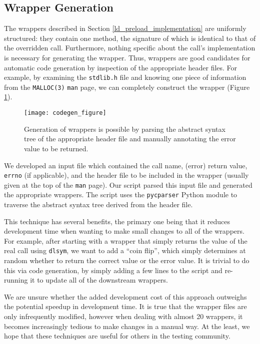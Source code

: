 \subsection{Wrapper Generation}
The wrappers described in Section \ref{ld_preload_implementation} are uniformly structured: they contain one method, the signature of which is identical to that of the overridden call. Furthermore, nothing specific about the call's implementation is necessary for generating the wrapper. Thus, wrappers are good candidates for automatic code generation by inspection of the appropriate header files. For example, by examining the \texttt{stdlib.h} file and knowing one piece of information from the \texttt{MALLOC(3)} \texttt{man} page, we can completely construct the wrapper (Figure \ref{fig:codegen}).

\begin{figure}[h!]
\centering
\texttt{[image: codegen\_figure]}
\caption{Generation of wrappers is possible by parsing the abstract syntax tree of the appropriate header file and manually annotating the error value to be returned.}
\label{fig:codegen}
\end{figure}

We developed an input file which contained the call name, (error) return value, \texttt{errno} (if applicable), and the header file to be included in the wrapper (usually given at the top of the \texttt{man} page). Our script parsed this input file and generated the appropriate wrappers. The script uses the \texttt{pycparser} Python module \cite{pycparser} to traverse the abstract syntax tree derived from the header file.

This technique has several benefits, the primary one being that it reduces development time when wanting to make small changes to all of the wrappers. For example, after starting with a wrapper that simply returns the value of the real call using \texttt{dlsym}, we want to add a ``coin flip'', which simply determines at random whether to return the correct value or the error value. It is trivial to do this via code generation, by simply adding a few lines to the script and re-running it to update all of the downstream wrappers.

We are unsure whether the added development cost of this approach outweighs the potential speedup in development time. It is true that the wrapper files are only infrequently modified, however when dealing with almost 20 wrappers, it becomes increasingly tedious to make changes in a manual way. At the least, we hope that these techniques are useful for others in the testing community.